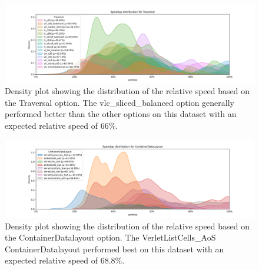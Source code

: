 \begin{figure}[H]
  \centering
  \includegraphics[width=\columnwidth,trim={1cm 0 2cm 1.5cm},clip]{figures/DataAnalytics/speedup_Traversal.png}
  \caption[Speedup density plot based on the Traversal option]{Density plot showing the distribution of the relative speed based on the Traversal option.  The vlc\_sliced\_balanced option generally performed better than the other options on this dataset with an expected relative speed of 66\%.}
  \label{fig:inputAnalysisDensityTraversal}
\end{figure}

\begin{figure}[H]
  \centering
  \includegraphics[width=\columnwidth,trim={1cm 0 2cm 1.5cm},clip]{figures/DataAnalytics/speedup_ContainerDataLayout.png}
  \caption[Speedup density plot of Configuration-Datalayout option]{Density plot showing the distribution of the relative speed based on the ContainerDatalayout option. The VerletListCells\_AoS ContainerDatalayout performed best on this dataset with an expected relative speed of 68.8\%.}
  \label{fig:inputAnalysisDensityDatalayout}
\end{figure}